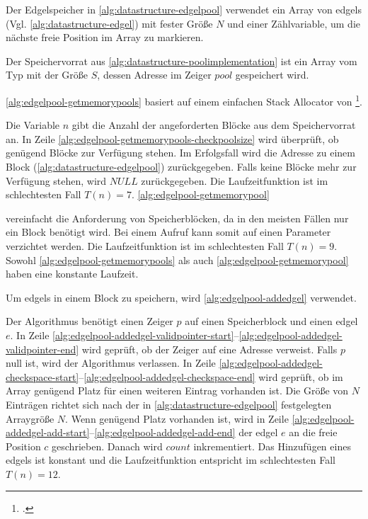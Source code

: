 Der Edgelspeicher in \autoref{alg:datastructure-edgelpool} verwendet ein Array von \glspl{edgel}
 (Vgl. \autoref{alg:datastructure-edgel}) mit fester Größe $N$ und einer Zählvariable, um die nächste freie Position im
 Array zu markieren.

Der Speichervorrat aus \autoref{alg:datastructure-poolimplementation} ist ein Array vom Typ
  mit der Größe $S$, dessen Adresse im Zeiger $\mathit{pool}$ gespeichert wird.

\autoref{alg:edgelpool-getmemorypools} basiert auf einem einfachen Stack Allocator von
 \citeauthor{kr}\footcite[Vgl.][S.~100--104]{kr}.

Die Variable $n$ gibt die Anzahl der angeforderten Blöcke aus dem Speichervorrat an. In Zeile
 \ref{alg:edgelpool-getmemorypools-checkpoolsize} wird überprüft, ob genügend Blöcke zur Verfügung stehen. Im
 Erfolgsfall wird die Adresse zu einem Block (\autoref{alg:datastructure-edgelpool}) zurückgegeben. Falls keine Blöcke
 mehr zur Verfügung stehen, wird $\mathit{NULL}$ zurückgegeben. Die Laufzeitfunktion ist im schlechtesten Fall
 $T(n)=7$.
\autoref{alg:edgelpool-getmemorypool}

 vereinfacht die Anforderung von Speicherblöcken, da in den meisten Fällen nur ein Block benötigt wird. Bei einem
 Aufruf kann somit auf einen Parameter verzichtet werden. Die Laufzeitfunktion ist im schlechtesten Fall $T(n)=9$.
 Sowohl \autoref{alg:edgelpool-getmemorypools} als auch \autoref{alg:edgelpool-getmemorypool} haben eine konstante
 Laufzeit.

Um \glspl{edgel} in einem Block zu speichern, wird \autoref{alg:edgelpool-addedgel} verwendet.

Der Algorithmus benötigt einen Zeiger $p$ auf einen Speicherblock und einen \gls{edgel} $e$. In Zeile
 \ref{alg:edgelpool-addedgel-validpointer-start}--\ref{alg:edgelpool-addedgel-validpointer-end} wird geprüft, ob der
 Zeiger auf eine Adresse verweist. Falls $p$ null ist, wird der Algorithmus verlassen. In Zeile
 \ref{alg:edgelpool-addedgel-checkspace-start}--\ref{alg:edgelpool-addedgel-checkspace-end} wird geprüft, ob im Array
 genügend Platz für einen weiteren Eintrag vorhanden ist. Die Größe von $N$ Einträgen richtet sich nach der in
 \autoref{alg:datastructure-edgelpool} festgelegten Arraygröße $N$. Wenn genügend Platz vorhanden ist, wird in Zeile
 \ref{alg:edgelpool-addedgel-add-start}--\ref{alg:edgelpool-addedgel-add-end} der \gls{edgel} $e$ an die freie
 Position $c$ geschrieben. Danach wird $\mathit{count}$ inkrementiert. Das Hinzufügen eines \glspl{edgel} ist konstant
 und die Laufzeitfunktion entspricht im schlechtesten Fall $T(n) = 12$.

